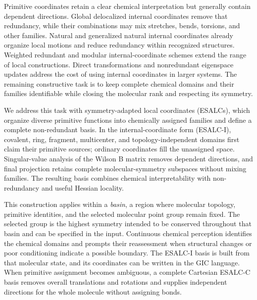 \documentclass[journal=jctcce,manuscript=article,layout=traditional]{achemso}
\theoremstyle{definition}
\begin{document}
{Primitive coordinates retain a clear chemical interpretation
but generally contain dependent directions. Global delocalized internal
coordinates remove that redundancy, while their combinations may mix
stretches, bends, torsions, and other families.\cite{PulayFogarasi1992,Peng1996Redundant,Baker1996Delocalized,Reveles2006Equivalent}
Natural and generalized natural internal coordinates already organize local
motions and reduce redundancy within recognized structures.\cite{Fogarasi1992Natural,Berces1997NaturalMetal,VonArnimAhlrichs1999GNIC,SwartBickelhaupt2006StrongWeak,Nemeth2010Choice}
Weighted redundant and modular internal-coordinate schemes extend the range
of local constructions.\cite{Lindh1999Weighted,Echenique2006SASMIC}
Direct transformations and nonredundant eigenspace updates address the cost
of using internal coordinates in larger systems.\cite{Paizs1998Direct,FarkasSchlegel1998Large,Liang2010Eigenspace}
The remaining constructive task is to keep complete chemical domains and
their families identifiable while closing the molecular rank and respecting
its symmetry.}

{We address this task with symmetry-adapted local coordinates (ESALCs), which
organize diverse primitive functions into chemically assigned families and
define a complete non-redundant basis. In the internal-coordinate form
(ESALC-I), covalent, ring, fragment, multicenter, and topology-independent
domains first claim their primitive sources; ordinary coordinates fill the
unassigned space.
Singular-value analysis of the Wilson B matrix removes dependent directions,
and final projection retains complete molecular-symmetry subspaces without
mixing families. The resulting basis
combines chemical interpretability with
non-redundancy and useful Hessian locality.}

{This construction applies within a \emph{basin}, a region
where molecular topology, primitive identities, and the selected molecular
point group remain fixed. The selected group is the highest symmetry intended
to be conserved throughout that basin and can be specified in the input.
Continuous chemical perception identifies the chemical domains and
prompts their reassessment when structural changes or poor conditioning
indicate a possible boundary.\cite{Barone2026Perception}
The ESALC-I basis is built from that molecular state, and its coordinates
can be written in the GIC language. When primitive assignment becomes ambiguous, a
complete Cartesian ESALC-C basis removes
overall translations and rotations and supplies independent directions for
the whole molecule without assigning bonds.}
\end{document}
